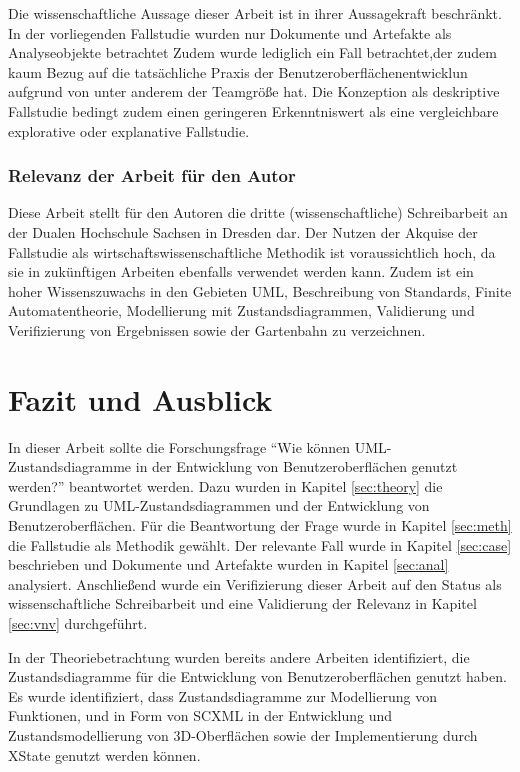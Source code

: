 \documentclass[first=Christoph,last=Hoentzsch,company=Softwareprojekt,location=Dresden,simple, noheader]{baarticle}
\begin{document}
\begin{basimple}
            Die wissenschaftliche Aussage dieser Arbeit ist in ihrer Aussagekraft beschränkt. 
            In der vorliegenden Fallstudie wurden nur Dokumente und Artefakte als Analyseobjekte betrachtet
            Zudem wurde lediglich ein Fall betrachtet,der zudem kaum Bezug auf die tatsächliche Praxis der Benutzeroberflächenentwicklun aufgrund von unter anderem der Teamgröße hat.
            Die Konzeption als deskriptive Fallstudie bedingt zudem einen geringeren Erkenntniswert als eine vergleichbare explorative oder explanative Fallstudie.

            \subsubsection{Relevanz der Arbeit für den Autor}
            Diese Arbeit stellt für den Autoren die dritte (wissenschaftliche) Schreibarbeit an der Dualen Hochschule Sachsen in Dresden dar. 
            Der Nutzen der Akquise der Fallstudie als wirtschaftswissenschaftliche Methodik ist voraussichtlich hoch, da sie in zukünftigen Arbeiten ebenfalls verwendet werden kann.
            Zudem ist ein hoher Wissenszuwachs in den Gebieten UML, Beschreibung von Standards, Finite Automatentheorie, Modellierung mit Zustandsdiagrammen, Validierung und Verifizierung von Ergebnissen sowie der Gartenbahn zu verzeichnen.


    \newpage
    \section{Fazit und Ausblick}
    In dieser Arbeit sollte die Forschungsfrage \enquote{Wie können \gls{UML}-Zustandsdiagramme in der Entwicklung von Benutzeroberflächen genutzt werden?} beantwortet werden. 
    Dazu wurden in Kapitel \ref{sec:theory} die Grundlagen zu \gls{UML}-Zustandsdiagrammen und der Entwicklung von Benutzeroberflächen.
    Für die Beantwortung der Frage wurde in Kapitel \ref{sec:meth} die Fallstudie als Methodik gewählt.
    Der relevante Fall wurde in Kapitel \ref{sec:case} beschrieben und Dokumente und Artefakte wurden in Kapitel \ref{sec:anal} analysiert.
    Anschließend wurde ein Verifizierung dieser Arbeit auf den Status als wissenschaftliche Schreibarbeit und eine Validierung der Relevanz in Kapitel \ref{sec:vnv} durchgeführt.

    In der Theoriebetrachtung wurden bereits andere Arbeiten identifiziert, die Zustandsdiagramme für die Entwicklung von Benutzeroberflächen genutzt haben. 
    Es wurde identifiziert, dass Zustandsdiagramme zur Modellierung von Funktionen, und in Form von SCXML in der Entwicklung und Zustandsmodellierung von 3D-Oberflächen sowie der Implementierung durch XState genutzt werden können. 


\end{basimple}
\end{document}
